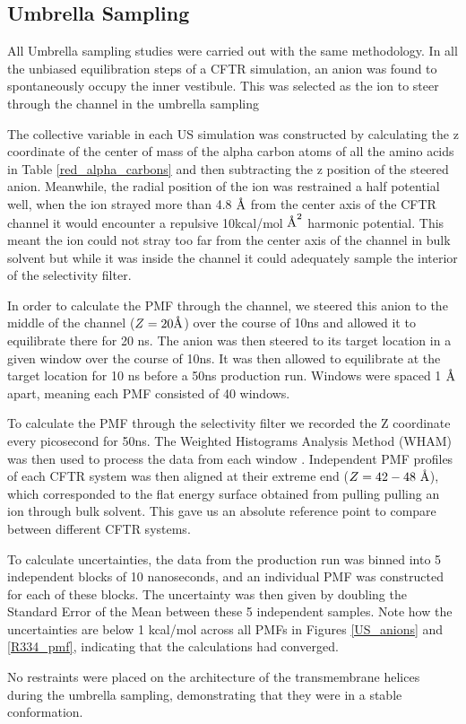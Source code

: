 \subsection{Umbrella Sampling}
All Umbrella sampling studies were carried out with the same methodology. In all the unbiased equilibration steps of a CFTR simulation, an anion was found to spontaneously occupy the inner vestibule. This was selected as the ion to steer through the channel in the umbrella sampling

The collective variable in each US simulation was constructed by calculating the z coordinate of the center of mass of the alpha carbon atoms of all the amino acids in Table \ref{red_alpha_carbons} and then subtracting the z position of the steered anion. Meanwhile, the radial position of the ion was restrained a half potential well, when the ion strayed more than 4.8 $\textup{\AA}$ from the center axis of the CFTR channel it would encounter a repulsive 10kcal/mol $\textup{\AA}^2$ harmonic potential. This meant the ion could not stray too far from the center axis of the channel in bulk solvent but while it was inside the channel it could adequately sample the interior of the selectivity filter.

In order to calculate the PMF through the channel, we steered this anion to the middle of the channel ($Z=20\textup{\AA}$) over the course of 10ns and allowed it to equilibrate there for 20 ns. The anion was then steered to its target location in a given window over the course of 10ns. It was then allowed to equilibrate at the target location for 10 ns before a 50ns production run. Windows were spaced 1 $\textup{\AA}$ apart, meaning each PMF consisted of 40 windows.

To calculate the PMF through the selectivity filter we recorded the Z coordinate every picosecond for 50ns. The Weighted Histograms Analysis Method (WHAM) was then used to process the data from each window \cite{grossfield2012}. Independent PMF profiles of each CFTR system was then aligned at their extreme end ($Z=42-48\ \textup{\AA}$), which corresponded to the flat energy surface obtained from pulling pulling an ion through bulk solvent. This gave us an absolute reference point to compare between different CFTR systems. 

To calculate uncertainties, the data from the production run was binned into 5 independent blocks of 10 nanoseconds, and an individual PMF was constructed for each of these blocks. The uncertainty was then given by doubling the Standard Error of the Mean between these 5 independent samples. Note how the uncertainties are below 1 kcal/mol across all PMFs in Figures \ref{US_anions} and \ref{R334_pmf}, indicating that the calculations had converged.

No restraints were placed on the architecture of the transmembrane helices during the umbrella sampling, demonstrating that they were in a stable conformation. 
